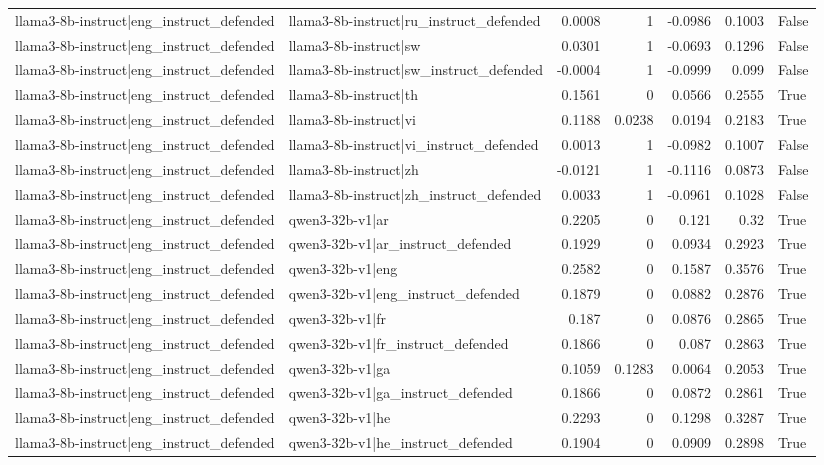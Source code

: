 \begin{table}
\begin{tabular}{l l r r r r l}
llama3-8b-instruct|eng_instruct_defended & llama3-8b-instruct|ru_instruct_defended & 0.0008 & 1 & -0.0986 & 0.1003 & False \\
llama3-8b-instruct|eng_instruct_defended & llama3-8b-instruct|sw & 0.0301 & 1 & -0.0693 & 0.1296 & False \\
llama3-8b-instruct|eng_instruct_defended & llama3-8b-instruct|sw_instruct_defended & -0.0004 & 1 & -0.0999 & 0.099 & False \\
llama3-8b-instruct|eng_instruct_defended & llama3-8b-instruct|th & 0.1561 & 0 & 0.0566 & 0.2555 & True \\
llama3-8b-instruct|eng_instruct_defended & llama3-8b-instruct|vi & 0.1188 & 0.0238 & 0.0194 & 0.2183 & True \\
llama3-8b-instruct|eng_instruct_defended & llama3-8b-instruct|vi_instruct_defended & 0.0013 & 1 & -0.0982 & 0.1007 & False \\
llama3-8b-instruct|eng_instruct_defended & llama3-8b-instruct|zh & -0.0121 & 1 & -0.1116 & 0.0873 & False \\
llama3-8b-instruct|eng_instruct_defended & llama3-8b-instruct|zh_instruct_defended & 0.0033 & 1 & -0.0961 & 0.1028 & False \\
llama3-8b-instruct|eng_instruct_defended & qwen3-32b-v1|ar & 0.2205 & 0 & 0.121 & 0.32 & True \\
llama3-8b-instruct|eng_instruct_defended & qwen3-32b-v1|ar_instruct_defended & 0.1929 & 0 & 0.0934 & 0.2923 & True \\
llama3-8b-instruct|eng_instruct_defended & qwen3-32b-v1|eng & 0.2582 & 0 & 0.1587 & 0.3576 & True \\
llama3-8b-instruct|eng_instruct_defended & qwen3-32b-v1|eng_instruct_defended & 0.1879 & 0 & 0.0882 & 0.2876 & True \\
llama3-8b-instruct|eng_instruct_defended & qwen3-32b-v1|fr & 0.187 & 0 & 0.0876 & 0.2865 & True \\
llama3-8b-instruct|eng_instruct_defended & qwen3-32b-v1|fr_instruct_defended & 0.1866 & 0 & 0.087 & 0.2863 & True \\
llama3-8b-instruct|eng_instruct_defended & qwen3-32b-v1|ga & 0.1059 & 0.1283 & 0.0064 & 0.2053 & True \\
llama3-8b-instruct|eng_instruct_defended & qwen3-32b-v1|ga_instruct_defended & 0.1866 & 0 & 0.0872 & 0.2861 & True \\
llama3-8b-instruct|eng_instruct_defended & qwen3-32b-v1|he & 0.2293 & 0 & 0.1298 & 0.3287 & True \\
llama3-8b-instruct|eng_instruct_defended & qwen3-32b-v1|he_instruct_defended & 0.1904 & 0 & 0.0909 & 0.2898 & True \\

\end{tabular}
\end{table}
